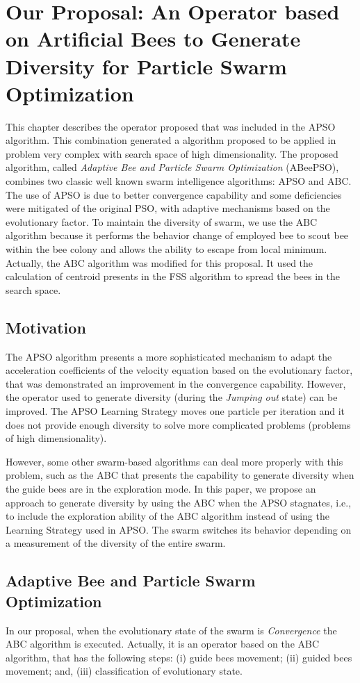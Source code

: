 \chapter{Our Proposal: An Operator based on Artificial Bees to Generate Diversity for Particle Swarm Optimization}\label{cap:contribution}
This chapter describes the operator proposed that was included in the APSO algorithm. This combination generated a algorithm proposed to be applied in problem very complex with search space of high dimensionality. The proposed algorithm, called \emph{Adaptive Bee and Particle Swarm Optimization} (ABeePSO), combines two classic well known swarm intelligence algorithms: APSO and ABC. The use of APSO is due to better convergence capability and some deficiencies were mitigated of the original PSO, with adaptive mechanisms based on the evolutionary factor. To maintain the diversity of swarm, we use the ABC algorithm because it performs the behavior change of employed bee to scout bee within the bee colony and allows the ability to escape from local minimum. Actually, the ABC algorithm was modified for this proposal. It used the calculation of centroid presents in the FSS algorithm to spread the bees in the search space.

\section{Motivation}
The APSO algorithm presents a more sophisticated mechanism to adapt the acceleration coefficients of the velocity equation based on the evolutionary factor, that was demonstrated an improvement in the convergence capability. However, the operator used to generate diversity (during the \emph{Jumping out} state) can be improved. The APSO Learning Strategy moves one particle per iteration and it does not provide enough diversity to solve more complicated problems (problems of high dimensionality).

However, some other swarm-based algorithms can deal more properly with this problem, such as the ABC that presents the capability to generate diversity when the guide bees are in the exploration mode. In this paper, we propose an approach to generate diversity by using the ABC when the APSO stagnates, i.e., to include the exploration ability of the ABC algorithm instead of using the Learning Strategy used in APSO. The swarm switches its behavior depending on a measurement of the diversity of the entire swarm.

\section{Adaptive Bee and Particle Swarm Optimization}
In our proposal, when the evolutionary state of the swarm is \emph{Convergence} the ABC algorithm is executed. Actually, it is an operator based on the ABC algorithm, that has the following steps: (i) guide bees movement; (ii) guided bees movement; and, (iii) classification of evolutionary state.

